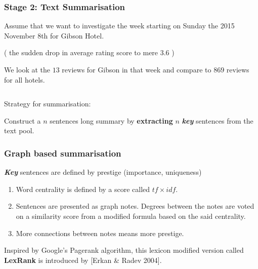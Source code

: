 \documentclass[xetex,mathserif,serif]{beamer}
\begin{document}
\begin{frame}

\frametitle{Stage 2: Text Summarisation}

Assume that we want to investigate the week starting on Sunday the 2015 November 8th for Gibson Hotel.

( the sudden drop in average rating score to mere 3.6 )

We look at the $13$ reviews for Gibson in that week and compare to $869$ reviews for all hotels. 

\begin{tabular}{c}
	\hline
\end{tabular}

Strategy for summarisation:

Construct a $n$ sentences long summary by \textbf{extracting} $n$ \textit{\textbf{key}} sentences from the text pool.


	
\end{frame}

\begin{frame}
	\frametitle{Graph based summarisation}
	\textbf{\textit{Key}} sentences are defined by prestige (importance, uniqueness)
	\begin{enumerate}
		\item Word centrality is defined by a score called $tf\times idf$. 
		\item Sentences are presented as graph notes. Degrees between the notes are voted on a similarity score from a modified formula based on the said centrality.
		\item More connections between notes means more prestige. 
	\end{enumerate}
	
	
	Inspired by Google's Pagerank algorithm, this lexicon modified version called \textbf{LexRank} is introduced by [Erkan \& Radev 2004].
\end{frame}
\end{document}
